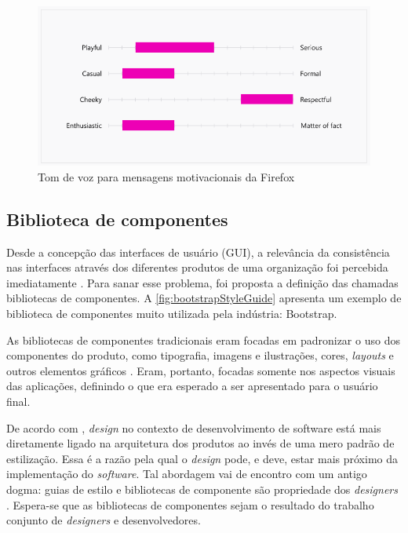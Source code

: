 \begin{figure}
	\includegraphics[width=\linewidth]{./04-figuras/02_referencial_teorico/firefox-tone-voice-02.png}
	\caption{Tom de voz para mensagens motivacionais da Firefox}
  \label{fig:firefoxVoiceTonePlayful}
\end{figure}

\subsection{Biblioteca de componentes}
\label{sec:bibliotecaComponentes}

Desde a concepção das interfaces de usuário (GUI), a relevância da consistência nas interfaces através dos diferentes produtos de uma organização foi percebida imediatamente \cite{ruissalo2018operating}. Para sanar esse problema, foi proposta a definição das chamadas bibliotecas de componentes. A \autoref{fig:bootstrapStyleGuide} apresenta um exemplo de biblioteca de componentes muito utilizada pela indústria: Bootstrap.

As bibliotecas de componentes tradicionais eram focadas em padronizar o uso dos componentes do produto, como tipografia, imagens e ilustrações, cores, \textit{layouts} e outros elementos gráficos \cite{ruissalo2018operating}. Eram, portanto, focadas somente nos aspectos visuais das aplicações, definindo o que era esperado a ser apresentado para o usuário final.

De acordo com \cite{taylor2007software}, \textit{design} no contexto de desenvolvimento de software está mais diretamente ligado na arquitetura dos produtos ao invés de uma mero padrão de estilização. Essa é a razão pela qual o \textit{design} pode, e deve, estar mais próximo da implementação do \textit{software}. Tal abordagem vai de encontro com um antigo dogma: guias de estilo e bibliotecas de componente são propriedade dos \textit{designers} \cite{ruissalo2018operating}. Espera-se que as bibliotecas de componentes sejam o resultado do trabalho conjunto de \textit{designers} e desenvolvedores.

